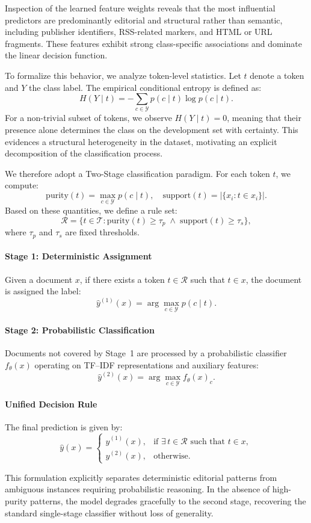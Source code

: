 Inspection of the learned feature weights reveals that the most influential predictors are predominantly editorial and structural rather than semantic, including publisher identifiers, RSS-related markers, and HTML or URL fragments. These features exhibit strong class-specific associations and dominate the linear decision function.

To formalize this behavior, we analyze token-level statistics. Let $t$ denote a token and $Y$ the class label. The empirical conditional entropy is defined as:
\[
H(Y \mid t) = - \sum_{c \in \mathcal{Y}} p(c \mid t)\log p(c \mid t).
\]
For a non-trivial subset of tokens, we observe $H(Y \mid t)=0$, meaning that their presence alone determines the class on the development set with certainty. This evidences a structural heterogeneity in the dataset, motivating an explicit decomposition of the classification process.

We therefore adopt a Two-Stage classification paradigm. For each token $t$, we compute:
\[
\text{purity}(t) = \max_{c \in \mathcal{Y}} p(c \mid t), \quad
\text{support}(t) = |\{x_i : t \in x_i\}|.
\]
Based on these quantities, we define a rule set:
\[
\mathcal{R} = \{t \in \mathcal{T} : \text{purity}(t) \ge \tau_p \;\wedge\; \text{support}(t) \ge \tau_s\},
\]
where $\tau_p$ and $\tau_s$ are fixed thresholds.

\paragraph{Stage 1: Deterministic Assignment}
Given a document $x$, if there exists a token $t \in \mathcal{R}$ such that $t \in x$, the document is assigned the label:
\[
\hat{y}^{(1)}(x) = \arg\max_{c \in \mathcal{Y}} p(c \mid t).
\]

\paragraph{Stage 2: Probabilistic Classification}
Documents not covered by Stage~1 are processed by a probabilistic classifier $f_\theta(x)$ operating on TF--IDF representations and auxiliary features:
\[
\hat{y}^{(2)}(x) = \arg\max_{c \in \mathcal{Y}} f_\theta(x)_c.
\]

\paragraph{Unified Decision Rule}
The final prediction is given by:
\[
\hat{y}(x) =
\begin{cases}
\hat{y}^{(1)}(x), & \text{if } \exists\, t \in \mathcal{R} \text{ such that } t \in x, \\
\hat{y}^{(2)}(x), & \text{otherwise}.
\end{cases}
\]

This formulation explicitly separates deterministic editorial patterns from ambiguous instances requiring probabilistic reasoning. In the absence of high-purity patterns, the model degrades gracefully to the second stage, recovering the standard single-stage classifier without loss of generality.
